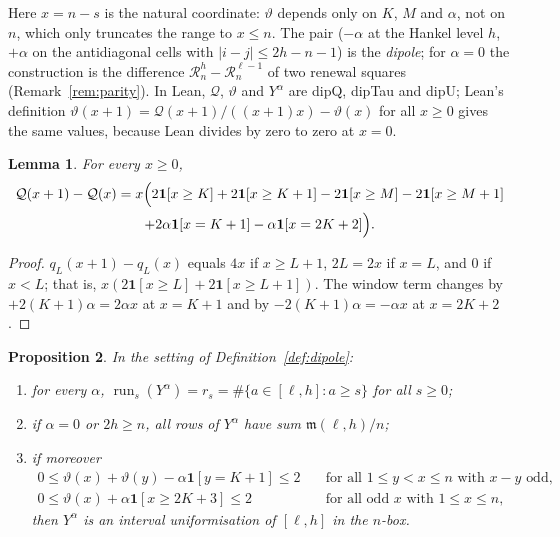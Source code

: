 \documentclass[11pt]{amsart}
\newtheorem{lemma}{Lemma}[section]
\newtheorem{proposition}[lemma]{Proposition}
\theoremstyle{definition}
\theoremstyle{remark}
\numberwithin{equation}{section}
\newcommand{\run}{\operatorname{run}}
\newcommand{\ind}[1]{\mathbf{1}[#1]}
\newcommand{\cQ}{\mathcal{Q}}
\newcommand{\cR}{\mathcal{R}}
\newcommand{\ms}{\mathfrak{m}}
\newcommand{\leanus}{\textunderscore\allowbreak}
\newcommand{\lean}[1]{{\ttfamily\let\_\leanus #1}}
\begin{document}
Here $x=n-s$ is the natural coordinate: $\vartheta$ depends only on $K$, $M$ and $\alpha$, not on $n$,
which only truncates the range to $x\le n$. The pair ($-\alpha$ at the Hankel level $h$, $+\alpha$ on the
antidiagonal cells with $|i-j|\le2h-n-1$) is the \emph{dipole}; for $\alpha=0$ the construction is the
difference $\cR^h_n-\cR^{\ell-1}_n$ of two renewal squares (Remark~\ref{rem:parity}). In Lean,
$\cQ$, $\vartheta$ and $Y^\alpha$ are \lean{dipQ}, \lean{dipTau} and \lean{dipU}; Lean's definition
$\vartheta(x+1)=\cQ(x+1)/((x+1)x)-\vartheta(x)$ for all $x\ge0$ gives the same values, because Lean
divides by zero to zero at $x=0$.

\begin{lemma}\label{lem:Qdiff}
For every $x\ge0$,
\begin{multline*}
  \cQ(x+1)-\cQ(x)=x\Bigl(2\ind{x\ge K}+2\ind{x\ge K+1}-2\ind{x\ge M}-2\ind{x\ge M+1}\\
  +2\alpha\ind{x=K+1}-\alpha\ind{x=2K+2}\Bigr).
\end{multline*}
\end{lemma}

\begin{proof}
$q_L(x+1)-q_L(x)$ equals $4x$ if $x\ge L+1$, $2L=2x$ if $x=L$, and $0$ if $x<L$; that is,
$x(2\ind{x\ge L}+2\ind{x\ge L+1})$. The window term changes by $+2(K+1)\alpha=2\alpha x$ at $x=K+1$ and
by $-2(K+1)\alpha=-\alpha x$ at $x=2K+2$.
\end{proof}

\begin{proposition}\label{prop:dipole}
In the setting of Definition~\ref{def:dipole}:
\begin{enumerate}
\item[(a)] for every $\alpha$, $\run_s(Y^\alpha)=r_s=\#\{a\in[\ell,h]:a\ge s\}$ for all $s\ge0$;
\item[(b)] if $\alpha=0$ or $2h\ge n$, all rows of $Y^\alpha$ have sum $\ms(\ell,h)/n$;
\item[(c)] if moreover
\begin{align}
  0\le\vartheta(x)+\vartheta(y)-\alpha\ind{y=K+1}\le2&\quad\text{for all }1\le y<x\le n\text{ with }x-y\text{ odd},
  \tag{CELL1}\label{eq:cell1}\\
  0\le\vartheta(x)+\alpha\ind{x\ge2K+3}\le2&\quad\text{for all odd }x\text{ with }1\le x\le n,
  \tag{CELL2}\label{eq:cell2}
\end{align}
then $Y^\alpha$ is an interval uniformisation of $[\ell,h]$ in the $n$-box.
\end{enumerate}
\end{proposition}
\end{document}
